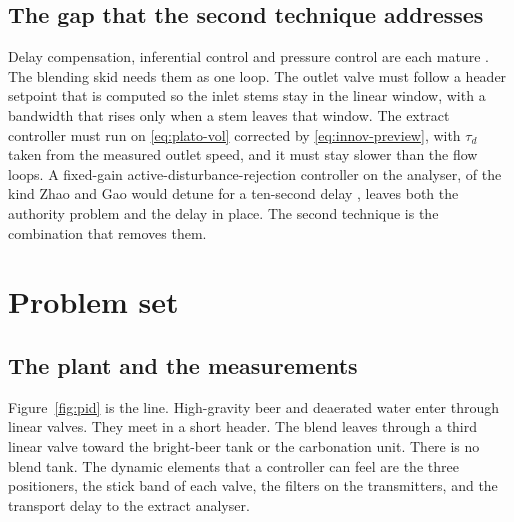 \subsection{The gap that the second technique addresses}

Delay compensation, inferential control and pressure control are each mature \cite{normey2008survey,zheng2014predictive,zhao2014delay,seborg2016process}. The blending skid needs them as one loop. The outlet valve must follow a header setpoint that is computed so the inlet stems stay in the linear window, with a bandwidth that rises only when a stem leaves that window. The extract controller must run on \eqref{eq:plato-vol} corrected by \eqref{eq:innov-preview}, with $\tau_d$ taken from the measured outlet speed, and it must stay slower than the flow loops. A fixed-gain active-disturbance-rejection controller on the analyser, of the kind Zhao and Gao would detune for a ten-second delay \cite{zhao2014delay}, leaves both the authority problem and the delay in place. The second technique is the combination that removes them.

\section{Problem set}
\label{sec:problem}

\subsection{The plant and the measurements}

Figure~\ref{fig:pid} is the line. High-gravity beer and deaerated water enter through linear valves. They meet in a short header. The blend leaves through a third linear valve toward the bright-beer tank or the carbonation unit. There is no blend tank. The dynamic elements that a controller can feel are the three positioners, the stick band of each valve, the filters on the transmitters, and the transport delay to the extract analyser.

